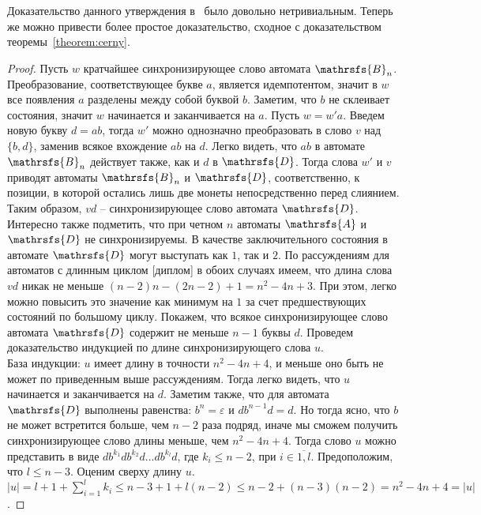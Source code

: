\documentclass[11pt]{article}
\begin{document}
Доказательство данного утверждения в~\cite{AVZ} было довольно нетривиальным. Теперь же можно привести
более простое доказательство, сходное с доказательством теоремы~\ref{theorem:cerny}.


\begin{proof}

Пусть $w$ кратчайшее синхронизирующее слово автомата $\mathrsfs{B}_n$.
Преобразование, соответствующее букве $a$, является идемпотентом,
значит в $w$ все появления $a$ разделены между собой буквой $b$. Заметим, что $b$ не склеивает состояния, значит
$w$ начинается и заканчивается на $a$. Пусть $w = w'a$.
Введем новую букву $d = ab$, тогда $w'$ можно однозначно преобразовать в слово $v$ над $\{b,d\}$, заменив всякое 
вхождение $ab$ на $d$. Легко видеть, что $ab$ в автомате $\mathrsfs{B}_n$ действует также, как и $d$ в $\mathrsfs{D}$.
Тогда слова $w'$ и $v$ приводят автоматы $\mathrsfs{B}_n$ и $\mathrsfs{D}$, соответственно, к позиции, в которой остались лишь две монеты
непосредственно перед слиянием. Таким образом, $vd$ -- синхронизирующее слово автомата $\mathrsfs{D}$. Интересно также подметить,
что при четном $n$ автоматы $\mathrsfs{A}$ и $\mathrsfs{D}$ не синхронизируемы.
В качестве заключительного состояния в автомате $\mathrsfs{D}$ могут выступать как $1$, так и $2$.
По рассуждениям для автоматов с длинным циклом [диплом] в обоих случаях имеем, что длина слова $vd$ никак не 
меньше $(n - 2)n - (2n - 2) + 1 = n^2 - 4n + 3$.
При этом, легко можно повысить это значение как минимум на $1$ за счет предшествующих состояний по большому циклу.
Покажем, что всякое синхронизирующее слово автомата $\mathrsfs{D}$ содержит не меньше $n - 1$ буквы $d$.
Проведем доказательство индукцией по длине синхронизирующего слова $u$.\\
База индукции: $u$ имеет длину в точности $n^2 - 4n + 4$, и меньше оно быть не может по приведенным выше рассуждениям.
Тогда легко видеть, что $u$ начинается и заканчивается на $d$. Заметим также, что для автомата $\mathrsfs{D}$ выполнены равенства:
$b^n = \varepsilon$ и $db^{n - 1}d = d$. Но тогда ясно, что $b$ не может встретится больше, чем $n - 2$ раза подряд, иначе мы 
сможем получить синхронизирующее слово длины меньше, чем $n^2 - 4n + 4$.
Тогда слово $u$ можно представить в виде $db^{k_1}db^{k_2}d...db^{k_l}d$, где $k_i \leq n - 2$, при $i \in \overline{1,l}$.
Предоположим, что $l \leq n - 3$.
Оценим сверху длину $u$. $|u| = l + 1 + \sum\limits_{i = 1}^{l}k_i \leq n - 3 + 1 + l(n - 2) \leq n - 2 + (n - 3)(n - 2) = n^2 - 4n + 4 = |u|$.

\end{proof}
\end{document}
